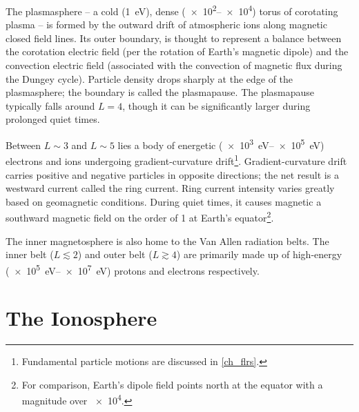The plasmasphere -- a cold (\about\SI{1}{\eV}), dense (\SIrange{e2}{e4}{\percc}) torus of corotating plasma -- is formed by the outward drift of atmospheric ions along magnetic closed field lines. Its outer boundary, is thought to represent a balance between the corotation electric field (per the rotation of Earth's magnetic dipole) and the convection electric field (associated with the convection of magnetic flux during the Dungey cycle). Particle density drops sharply at the edge of the plasmasphere; the boundary is called the plasmapause. The plasmapause typically falls around $L=4$, though it can be significantly larger during prolonged quiet times. 

Between $L\sim3$ and $L\sim5$ lies a body of energetic (\SIrange{e3}{e5}{\eV}) electrons and ions undergoing gradient-curvature drift\footnote{Fundamental particle motions are discussed in \cref{ch_flrs}. }. Gradient-curvature drift carries positive and negative particles in opposite directions; the net result is a westward current called the ring current. Ring current intensity varies greatly based on geomagnetic conditions. During quiet times, it causes magnetic a southward magnetic field on the order of \SI{1}{\nT} at Earth's equator\footnote{For comparison, Earth's dipole field points north at the equator with a magnitude over \SI{e4}{\nT}. }. 

The inner magnetosphere is also home to the Van Allen radiation belts. The inner belt ($L\lesssim2$) and outer belt ($L\gtrsim4$) are primarily made up of high-energy (\SIrange{e5}{e7}{\eV}) protons and electrons respectively. 


\section{The Ionosphere}
  \label{sec_ionos}



